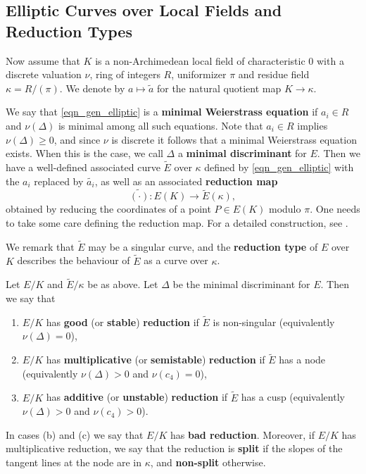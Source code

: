\subsection{Elliptic Curves over Local Fields and Reduction Types}

Now assume that $K$ is a non-Archimedean local field of characteristic $0$ with a discrete valuation $\nu$, ring of integers $R$, uniformizer $\pi$ and residue field $\kappa = R / (\pi)$. We denote by $a\mapsto \tilde{a}$ for the natural quotient map $K\to\kappa$.

We say that \eqref{eqn_gen_elliptic} is a \textbf{minimal Weierstrass equation} if $a_i \in R$ and $\nu(\Delta)$ is minimal among all such equations. Note that $a_i \in R$ implies $\nu(\Delta) \geq 0$, and since $\nu$ is discrete it follows that a minimal Weierstrass equation exists. When this is the case, we call $\Delta$ a \textbf{minimal discriminant} for $E$. Then we have a well-defined associated curve $\tilde{E}$ over $\kappa$ defined by \eqref{eqn_gen_elliptic} with the $a_i$ replaced by $\tilde{a_i}$, as well as an associated \textbf{reduction map}
\begin{equation}\label{eqn_reduction}
    \widetilde{(\cdot)}:E(K)\longrightarrow \tilde{E}(\kappa),
\end{equation}
obtained by reducing the coordinates of a point $P\in E(K)$ modulo $\pi$. One needs to take some care defining the reduction map. For a detailed construction, see \cite[\S1 VII.2]{S1}. 

We remark that $\tilde{E}$ may be a singular curve, and the \textbf{reduction type} of $E$ over $K$ describes the behaviour of $\tilde{E}$ as a curve over $\kappa$.

\begin{defn}
    Let $E/K$ and $\tilde{E}/\kappa$ be as above. Let $\Delta$ be the minimal discriminant for $E$. Then we say that 
    \begin{enumerate}[label={(\alph*)}]
        \setlength\itemsep{0em}
        \item $E/K$ has \textbf{good} (or \textbf{stable}) \textbf{reduction} if $\tilde{E}$ is non-singular (equivalently $\nu(\Delta) = 0$), 
        \item $E/K$ has \textbf{multiplicative} (or \textbf{semistable}) \textbf{reduction} if $\tilde{E}$ has a node (equivalently $\nu(\Delta) >0$ and $\nu(c_4) = 0$),
        \item $E/K$ has \textbf{additive} (or \textbf{unstable}) \textbf{reduction} if $\tilde{E}$ has a cusp (equivalently $\nu(\Delta) >0$ and $\nu(c_4) > 0$).
    \end{enumerate}
    In cases (b) and (c) we say that $E/K$ has \textbf{bad reduction}. Moreover, if $E/K$ has multiplicative reduction, we say that the reduction is \textbf{split} if the slopes of the tangent lines at the node are in $\kappa$, and \textbf{non-split} otherwise.
\end{defn}

